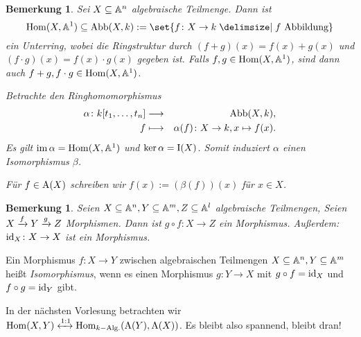 \documentclass[12pt,a4paper]{scrartcl}
\theoremstyle{cplain}
\theoremstyle{cdef}
\newtheorem{beme}[thmcounter]{Bemerkung}
\begin{document}
\begin{beme} \label{bem:8.23}
	Sei $X\subseteq \mathbb A^n$ algebraische Teilmenge. Dann ist 
	\[\Hom(X, \IA^1)\subseteq \Abb(X,k) := \set{f\colon X\to k\given f\text{ Abbildung}}\]
	ein Unterring, wobei die Ringstruktur durch $(f+g)(x) = f(x) +g(x)$ und $(f\cdot g)(x) = f(x) \cdot g(x)$ gegeben ist. Falls $f,g\in\operatorname{Hom}(X,\mathbb A^1)$, sind dann auch $f+g,f\cdot g\in\operatorname{Hom}(X,\mathbb A^1)$.
	
	Betrachte den Ringhomomorphismus
	\begin{eqnarray*}
		\alpha\colon k[t_1,\dots, t_n] &\longrightarrow& \operatorname{Abb}(X,k), \\
		f &\longmapsto& \alpha(f)\colon X\to k, x\mapsto f(x).
	\end{eqnarray*}
	Es gilt $\operatorname{im} \alpha = \operatorname{Hom}(X,\mathbb A^1)$ und $\operatorname{ker} \alpha = \operatorname{I}(X)$. Somit induziert $\alpha$ einen Isomorphismus $\beta$.
	\begin{center}
	\end{center}
	Für $f\in \operatorname{A}(X)$ schreiben wir $f(x) := (\beta(f))(x)$ für $x\in X$.
\end{beme}
\begin{beme}
	Seien $X\subseteq \mathbb A^n, Y\subseteq \mathbb A^m, Z\subseteq \mathbb A^l$ algebraische Teilmengen, Seien $X\xrightarrow{f}Y\xrightarrow{g}Z$ Morphismen. Dann ist $g\circ f\colon X\to Z$ ein Morphismus. Außerdem: $\operatorname{id}_X\colon X\to X$ ist ein Morphismus.
\end{beme}
\begin{defi}
	Ein Morphismus $f\colon X\to Y$ zwischen algebraischen Teilmengen $X\subseteq \mathbb A^n, Y\subseteq \mathbb A^m$ heißt \emph{Isomorphismus}, wenn es einen Morphismus $g\colon Y\to X$ mit $g\circ f = \operatorname{id}_X$ und $f\circ g = \operatorname{id}_Y$ gibt.
\end{defi}

\medskip

In der nächsten Vorlesung betrachten wir $\operatorname{Hom}(X,Y)\xleftrightarrow{1:1}\operatorname{Hom}_{k-\text{Alg.}}(\operatorname{A}(Y),\operatorname{A}(X))$. Es bleibt also spannend, bleibt dran!

\end{document}
